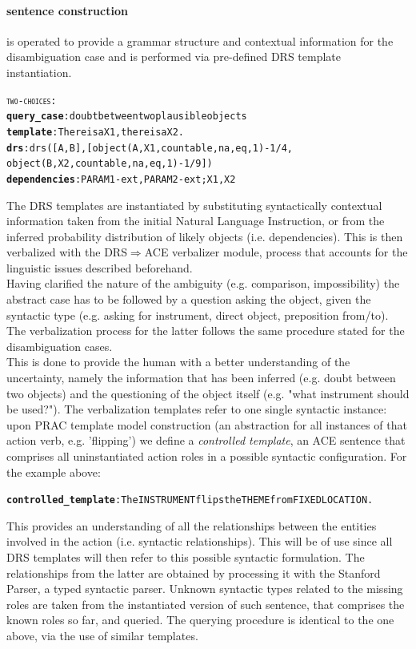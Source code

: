 \documentclass[oribibl]{llncs}
\begin{document}
\paragraph{sentence construction} is operated to provide a grammar structure and contextual information for the disambiguation case and is performed via pre-defined DRS template instantiation. 
\begin{alltt}
{\large \textsc{two-choices}}:
    \textbf{query_case}: doubt between two plausible objects
    \textbf{template}: There is a X1, there is a X2.
    \textbf{drs}: drs([A,B],[object(A,X1,countable,na,eq,1)-1/4,
    object(B,X2,countable,na,eq,1)-1/9])
    \textbf{dependencies}: PARAM1-ext, PARAM2-ext; X1, X2
\end{alltt}
The DRS templates are instantiated by substituting syntactically contextual information taken from the initial Natural Language Instruction, or from the inferred probability distribution of likely objects (i.e. dependencies).
This is then verbalized with the DRS$\Rightarrow$ACE verbalizer module, process that accounts for the linguistic issues described beforehand.\\
Having clarified the nature of the ambiguity (e.g. comparison, impossibility) the abstract case has to be followed by a question asking the object, given the syntactic type (e.g. asking for instrument, direct object, preposition from/to). The verbalization process for the latter follows the same procedure stated for the disambiguation cases. \\
This is done to provide the human with a better understanding of the uncertainty, namely the information that has been inferred (e.g. doubt between two objects) and the questioning of the object itself (e.g. "what instrument should be used?").  
The verbalization templates refer to one single syntactic instance: upon PRAC template model construction (an abstraction for all instances of that action verb, e.g. 'flipping') we define a \textit{controlled template}, an ACE sentence that comprises all uninstantiated action roles in a possible syntactic configuration.
For the example above:
{\small
\begin{alltt}
\textbf{controlled_template}: The INSTRUMENT flips the THEME from FIXEDLOCATION. 
\end{alltt}
}%
This provides an understanding of all the relationships between the entities involved in the action (i.e. syntactic relationships).
This will be of use since all DRS templates will then refer to this possible syntactic formulation. The relationships from the latter are obtained by processing it with the Stanford Parser\cite{mcdm08b}, a typed syntactic parser.
Unknown syntactic types related to the missing roles are taken from the instantiated version of such sentence, that comprises the known roles so far, and queried.
The querying procedure is identical to the one above, via the use of similar templates.
\end{document}
